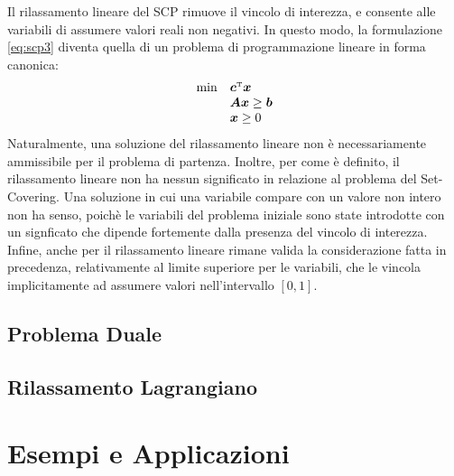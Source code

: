 Il rilassamento lineare del SCP rimuove il vincolo di interezza, e consente alle variabili di assumere valori reali non
negativi. In questo modo, la formulazione \ref{eq:scp3} diventa quella di un problema di programmazione lineare in forma
canonica:
\begin{equation}\label{eq:scp4}
    \begin{array}{ll}
        \min & \bm{c}^{\scriptscriptstyle\mathrm{T}}\bm{x}\\
        &\bm{A}\bm{x} \geq \bm{b} \\
        &\bm{x} \geq 0
    \end{array}
\end{equation}
Naturalmente, una soluzione del rilassamento lineare non è necessariamente ammissibile per il problema di partenza.
Inoltre, per come è definito, il rilassamento lineare non ha nessun significato in relazione al problema del
Set-Covering. Una soluzione in cui una variabile compare con un valore non intero non ha senso, poichè le variabili del
problema iniziale sono state introdotte con un signficato che dipende fortemente dalla presenza del vincolo di
interezza. Infine, anche per il rilassamento lineare rimane valida la considerazione fatta in precedenza, relativamente
al limite superiore per le variabili, che le vincola implicitamente ad assumere valori nell'intervallo \( [0, 1] \).

\subsection{Problema Duale}

\subsection{Rilassamento Lagrangiano}

\section{Esempi e Applicazioni}
